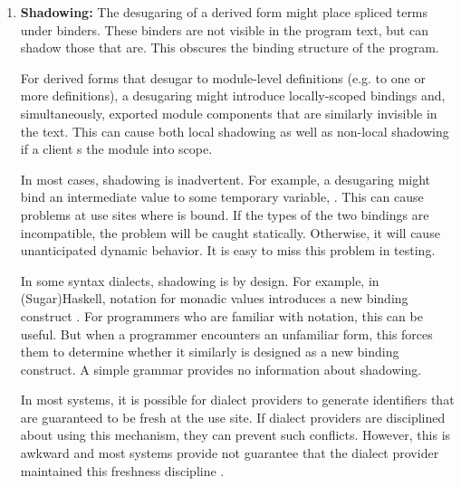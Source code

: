 {\begin{enumerate}
Systems that support the generation of editor plug-ins, such as Spoofax \cite{kats2010spoofax} and Sugarclipse for SugarJ \cite{Erdweg:2012:GLE}, can generate syntax coloring logic from an annotated grammar definition, which often give programmers some indication of where a spliced term occurs. However, there is no definitive information about segmentation in how the editor displays the derived form. (Moreover, these editor plug-ins can themselves conflict, even if the syntax itself is deterministic.)
\item \textbf{Shadowing:} The desugaring of a derived form might place spliced terms under binders. These binders are not visible in the program text, but can shadow those that are. This obscures the binding structure of the program.

For derived forms that desugar to module-level definitions (e.g. to one or more  definitions), a desugaring might introduce locally-scoped bindings and, simultaneously, exported module components that are similarly invisible in the text. This can cause both local shadowing as well as non-local shadowing if a client s the module into scope.

In most cases, shadowing is inadvertent. For example, a desugaring might bind an intermediate value to some temporary variable, . This can cause problems at use sites where  is bound. If the types of the two bindings are incompatible, the problem will be caught statically. Otherwise, it will cause unanticipated dynamic behavior. It is easy to miss this problem in testing.

In some syntax dialects, shadowing is by design. For example, in (Sugar)Haskell,  notation for monadic values introduces a new binding construct \cite{erdweg2012layout}. For programmers who {are} familiar with  notation, this can be useful. But when a programmer encounters an unfamiliar form, this forces them to determine whether it similarly is designed as a new binding construct. A simple grammar provides no information about shadowing.%

In most systems, it is possible for dialect providers to generate identifiers that are guaranteed to be fresh at the use site. If dialect providers are disciplined about using this mechanism, they can prevent such  conflicts. However, this is awkward and most systems provide not guarantee that the dialect provider maintained this freshness discipline \cite{conf/ecoop/ErdwegSD14}.


\end{enumerate}}
